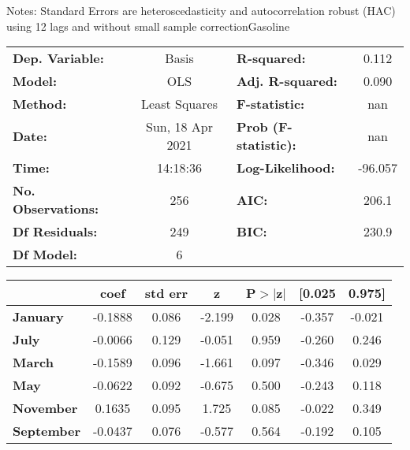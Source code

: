 Notes: \newline
 [1] Standard Errors are heteroscedasticity and autocorrelation robust (HAC) using 12 lags and without small sample correctionGasoline\begin{center}
\begin{tabular}{lclc}
\toprule
\textbf{Dep. Variable:}    &      Basis       & \textbf{  R-squared:         } &     0.112   \\
\textbf{Model:}            &       OLS        & \textbf{  Adj. R-squared:    } &     0.090   \\
\textbf{Method:}           &  Least Squares   & \textbf{  F-statistic:       } &       nan   \\
\textbf{Date:}             & Sun, 18 Apr 2021 & \textbf{  Prob (F-statistic):} &      nan    \\
\textbf{Time:}             &     14:18:36     & \textbf{  Log-Likelihood:    } &   -96.057   \\
\textbf{No. Observations:} &         256      & \textbf{  AIC:               } &     206.1   \\
\textbf{Df Residuals:}     &         249      & \textbf{  BIC:               } &     230.9   \\
\textbf{Df Model:}         &           6      & \textbf{                     } &             \\
\bottomrule
\end{tabular}
\begin{tabular}{lcccccc}
                   & \textbf{coef} & \textbf{std err} & \textbf{z} & \textbf{P$> |$z$|$} & \textbf{[0.025} & \textbf{0.975]}  \\
\midrule
\textbf{January}   &      -0.1888  &        0.086     &    -2.199  &         0.028        &       -0.357    &       -0.021     \\
\textbf{July}      &      -0.0066  &        0.129     &    -0.051  &         0.959        &       -0.260    &        0.246     \\
\textbf{March}     &      -0.1589  &        0.096     &    -1.661  &         0.097        &       -0.346    &        0.029     \\
\textbf{May}       &      -0.0622  &        0.092     &    -0.675  &         0.500        &       -0.243    &        0.118     \\
\textbf{November}  &       0.1635  &        0.095     &     1.725  &         0.085        &       -0.022    &        0.349     \\
\textbf{September} &      -0.0437  &        0.076     &    -0.577  &         0.564        &       -0.192    &        0.105     \\

\end{tabular}
\end{center}
